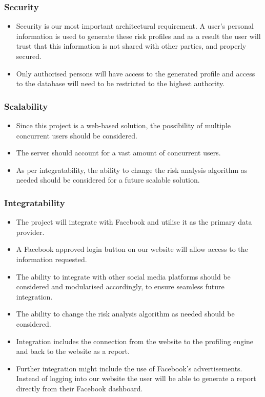 \documentclass{article}
\begin{document}
		\subsubsection{Security}\label{subsubsec:security}
		\begin{itemize}
			\item Security is our most important architectural requirement. A user's personal information is used to generate these risk profiles and as a result the user will trust that this information is not shared with other parties, and properly secured.
			\item Only authorised persons will have access to the generated profile and access to the database will need to be restricted to the highest authority.
		\end{itemize}
		\subsubsection{Scalability}
		\begin{itemize}
			\item Since this project is a web-based solution, the possibility of multiple concurrent users should be considered.
			\item The server should account for a vast amount of concurrent users.
			\item As per integratability, the ability to change the risk analysis algorithm as needed should be considered for a future scalable solution.
		\end{itemize}

		\subsubsection{Integratability}\label{subsubsec:integratability}
		\begin{itemize}
			\item The project will integrate with Facebook and utilise it as the primary data provider.
			\item A Facebook approved login button on our website will allow access to the information requested. 
			\item The ability to integrate with other social media platforms should be considered and modularised accordingly, to ensure seamless future integration. 
			\item The ability to change the risk analysis algorithm as needed should be considered.
			\item Integration includes the connection from the website to the profiling engine and back to the website as a report.
			\item Further integration might include the use of Facebook's advertisements. Instead of logging into our website the user will be able to generate a report directly from their Facebook dashboard.
		\end{itemize}		
\end{document}

